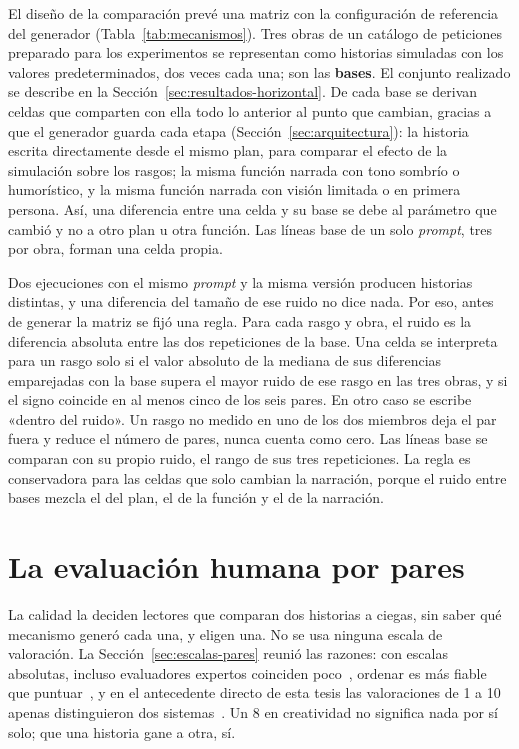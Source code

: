 El diseño de la comparación prevé una matriz con la configuración de referencia del generador
(Tabla~\ref{tab:mecanismos}). Tres obras de un catálogo de peticiones preparado para los
experimentos se representan como historias simuladas con los valores predeterminados, dos veces cada
una; son las \textbf{bases}. El conjunto realizado se describe en la
Sección~\ref{sec:resultados-horizontal}. De
cada base se derivan celdas que comparten con ella todo lo anterior al punto que cambian, gracias a
que el generador guarda cada etapa (Sección~\ref{sec:arquitectura}): la historia escrita
directamente desde el mismo plan, para comparar el efecto de la simulación sobre los rasgos; la misma función narrada con tono sombrío o
humorístico, y la misma función narrada con visión limitada o en primera persona. Así, una
diferencia entre una celda y su base se debe al parámetro que cambió y no a otro plan u otra
función. Las líneas base de un solo \textit{prompt}, tres por obra, forman una celda propia.

Dos ejecuciones con el mismo \textit{prompt} y la misma versión producen historias distintas, y una
diferencia del tamaño de ese ruido no dice nada. Por eso, antes de generar la matriz se fijó una
regla. Para cada rasgo y obra, el ruido es la diferencia absoluta entre las dos repeticiones de la
base. Una celda se interpreta para un rasgo solo si el valor absoluto de la mediana de sus
diferencias emparejadas con la base supera el mayor ruido de ese rasgo en las tres obras, y si el
signo coincide en al menos cinco de los seis pares. En otro caso se escribe «dentro del ruido». Un
rasgo no medido en uno de los dos miembros deja el par fuera y reduce el número de pares, nunca
cuenta como cero. Las líneas base se comparan con su propio ruido, el rango de sus tres repeticiones.
La regla es conservadora para las celdas que solo cambian la narración, porque el ruido entre bases
mezcla el del plan, el de la función y el de la narración.

\section{La evaluación humana por pares}\label{sec:pares}

La calidad la deciden lectores que comparan dos historias a ciegas, sin saber qué mecanismo generó
cada una, y eligen una. No se usa ninguna escala de valoración. La
Sección~\ref{sec:escalas-pares} reunió las razones: con escalas absolutas, incluso evaluadores
expertos coinciden poco~\cite{chiang2023,amidei2019}, ordenar es más fiable que
puntuar~\cite{novikova2018,vanderlee2019}, y en el antecedente directo de esta tesis las
valoraciones de 1 a 10 apenas distinguieron dos sistemas~\cite{fuentes2025}. Un 8 en creatividad no
significa nada por sí solo; que una historia gane a otra, sí.

